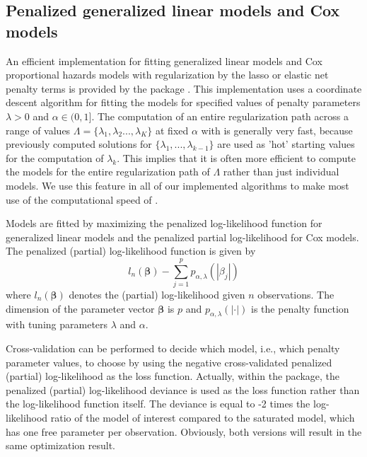 \documentclass[]{jss}
\begin{document}
\subsection{Penalized generalized linear models and Cox models}\label{methods:penalized}
An efficient implementation for fitting generalized linear models and Cox proportional hazards models with regularization by the lasso or elastic net penalty terms is provided by the  package . This implementation uses a coordinate descent algorithm for fitting the models for specified values of penalty parameters $\lambda > 0$ and $\alpha \in (0,1]$. The computation of an entire regularization path across a range of values $\Lambda = \{\lambda_1,\lambda_2...,\lambda_K\}$ at fixed $\alpha$ with  is generally very fast, because previously computed solutions for $\{\lambda_1,...,\lambda_{k-1}\}$ are used as 'hot' starting values for the computation of $\lambda_k$. This implies that it is often more efficient to compute the models for the entire regularization path of $\Lambda$ rather than just individual models. We use this feature in all of our implemented algorithms to make most use of the computational speed of .

Models are fitted by maximizing the penalized log-likelihood function for generalized linear models and the penalized partial log-likelihood for Cox models. The penalized (partial) log-likelihood function is given by
\begin{equation}\label{pen.part.likelihood}
l_n(\boldsymbol\beta)- \sum_{j=1}^p  p_{\alpha,\lambda}(|\beta_j|)
\end{equation}
where $l_n(\boldsymbol\beta)$ denotes the (partial) log-likelihood given $n$ observations.
The dimension of the parameter vector $\boldsymbol\beta$ is $p$ and $p_{\alpha,\lambda}(|\cdot|)$ is the penalty function with tuning parameters $\lambda$ and $\alpha$.

Cross-validation can be performed to decide which model, i.e., which penalty parameter values, to choose by using the negative cross-validated penalized (partial) log-likelihood as the loss function. Actually, within the  package, the penalized (partial) log-likelihood deviance is used as the loss function rather than the log-likelihood function itself. The deviance is equal to -2 times the log-likelihood ratio of the model of interest compared to the saturated model, which has one free parameter per observation. Obviously, both versions will result in the same optimization result.
\end{document}
